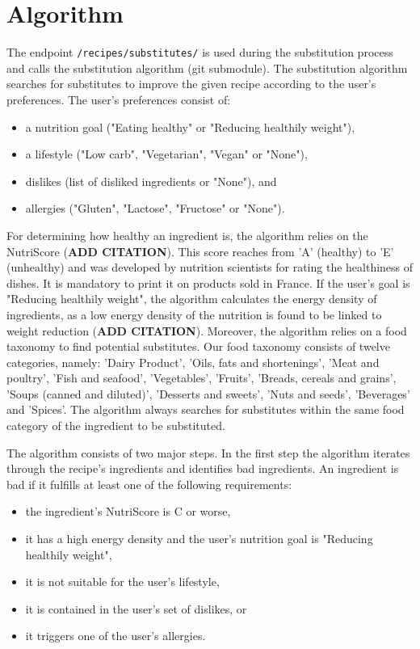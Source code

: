 \section{Algorithm}
The endpoint \texttt{/recipes/substitutes/} is used during the substitution process and calls the substitution algorithm (git submodule). The substitution algorithm searches for substitutes to improve the given recipe according to the user's preferences. The user's preferences consist of:
\begin{itemize}
	\itemsep-0.5em 
	\item a nutrition goal ("Eating healthy" or "Reducing healthily weight"),
	\item a lifestyle ("Low carb", "Vegetarian", "Vegan" or "None"),
	\item dislikes (list of disliked ingredients or "None"), and
	\item allergies ("Gluten", "Lactose", "Fructose" or "None").
\end{itemize} 
For determining how healthy an ingredient is, the algorithm relies on the NutriScore (\textbf{ADD CITATION}). This score reaches from 'A' (healthy) to 'E' (unhealthy) and was developed by nutrition scientists for rating the healthiness of dishes. It is mandatory to print it on products sold in France. If the user's goal is "Reducing healthily weight", the algorithm calculates the energy density of ingredients, as a low energy density of the nutrition is found to be linked to weight reduction (\textbf{ADD CITATION}). Moreover, the algorithm relies on a food taxonomy to find potential substitutes. Our food taxonomy consists of twelve categories, namely: 'Dairy Product',  'Oils, fats and shortenings', 'Meat and poultry',    'Fish and seafood', 'Vegetables', 'Fruits', 'Breads, cereals and grains', 'Soups (canned and diluted)', 'Desserts and sweets', 'Nuts and seeds', 'Beverages' and 'Spices'. The algorithm always searches for substitutes within the same food category of the ingredient to be substituted.


The algorithm consists of two major steps. In the first step the algorithm iterates through the recipe's ingredients and identifies bad ingredients. An ingredient is bad if it fulfills at least one of the following requirements:
\begin{itemize}
	\itemsep-0.5em 
	\item the ingredient's NutriScore is C or worse,
	\item it has a high energy density and the user's nutrition goal is "Reducing healthily weight",
	\item it is not suitable for the user's lifestyle,
	\item it is contained in the user's set of dislikes, or
	\item it triggers one of the user's allergies.
\end{itemize}

